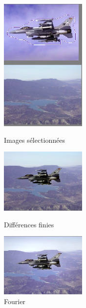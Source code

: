 \begin{figure}[!htb]
   \begin{minipage}{0.33\textwidth}
     \centering
     \includegraphics[width = 120pt]{Images/Resultats/avionlac.png}
     \caption{Images sélectionnées}
      \end{minipage}\hfill
   \begin{minipage}{0.33\textwidth}
     \centering
     \includegraphics[width = 120pt]{Images/Resultats/avion.png}
     \caption{Différences finies}
      \end{minipage}\hfill
   \begin{minipage}{0.33\textwidth}
     \centering
     \includegraphics[width= 120pt]{Images/Resultats/avionFourier.png}
     \caption{Fourier}
   \end{minipage}
\end{figure}

\newpage